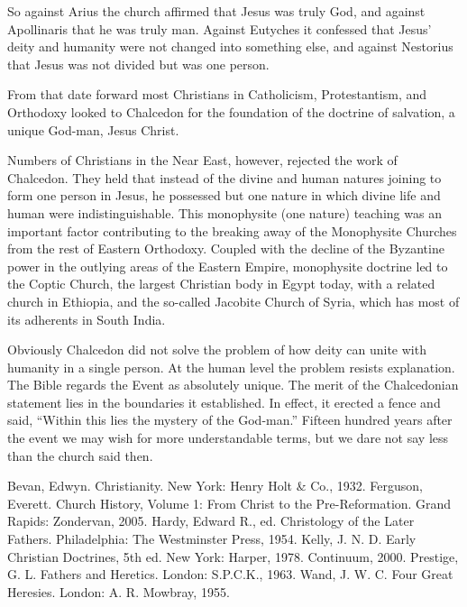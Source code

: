 So against Arius the church affirmed that Jesus was truly God, and against Apollinaris that he was
truly man. Against Eutyches it confessed that Jesus’ deity and humanity were not changed into
something else, and against Nestorius that Jesus was not divided but was one person.

From that date forward most Christians in Catholicism, Protestantism, and Orthodoxy looked to
Chalcedon for the foundation of the doctrine of salvation, a unique God-man, Jesus Christ.

Numbers of Christians in the Near East, however, rejected the work of Chalcedon. They held that
instead of the divine and human natures joining to form one person in Jesus, he possessed but one
nature in which divine life and human were indistinguishable. This monophysite (one nature) teaching
was an important factor contributing to the breaking away of the Monophysite Churches from the rest
of Eastern Orthodoxy. Coupled with the decline of the Byzantine power in the outlying areas of the
Eastern Empire, monophysite doctrine led to the Coptic Church, the largest Christian body in Egypt
today, with a related church in Ethiopia, and the so-called Jacobite Church of Syria, which has most
of its adherents in South India.

Obviously Chalcedon did not solve the problem of how deity can unite with humanity in a single
person. At the human level the problem resists explanation. The Bible regards the Event as
absolutely unique. The merit of the Chalcedonian statement lies in the boundaries it established. In
effect, it erected a fence and said, “Within this lies the mystery of the God-man.” Fifteen hundred
years after the event we may wish for more understandable terms, but we dare not say less than the
church said then.

\begin{readinglist}
\entry Bevan, Edwyn. Christianity. New York: Henry Holt \& Co., 1932.
\entry *Ferguson, Everett. Church History, Volume 1: From Christ to the Pre-Reformation. Grand
  Rapids: Zondervan, 2005.
\entry Hardy, Edward R., ed. Christology of the Later Fathers. Philadelphia: The Westminster Press,
  1954.
\entry Kelly, J. N. D. Early Christian Doctrines, 5th ed. New York: Harper, 1978. Continuum, 2000.
\entry Prestige, G. L. Fathers and Heretics. London: S.P.C.K., 1963.
\entry Wand, J. W. C. Four Great Heresies. London: A. R. Mowbray, 1955.
\end{readinglist}

